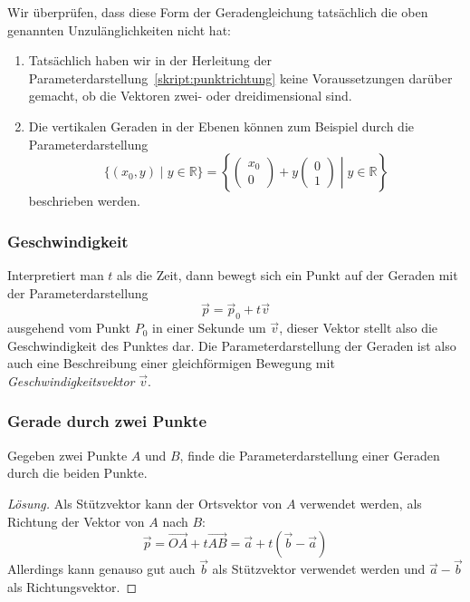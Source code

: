 Wir überprüfen, dass diese Form der Geradengleichung tatsächlich die
oben genannten Unzulänglichkeiten nicht hat:
\begin{enumerate}
\item Tatsächlich haben wir in der Herleitung der
Parameterdarstellung~\eqref{skript:punktrichtung} keine Voraussetzungen
darüber gemacht, ob die Vektoren zwei- oder dreidimensional sind.
\item Die vertikalen Geraden in der Ebenen können zum Beispiel durch die
Parameterdarstellung
\[
\{ (x_0,y)\;|\; y\in\mathbb R\}
=
\left\{
\left.
\begin{pmatrix}x_0\\0\end{pmatrix}
+
y\begin{pmatrix}0\\1\end{pmatrix}
\;
\right|
\;
y\in\mathbb R
\right\}
\]
beschrieben werden.
\end{enumerate}

\subsubsection{Geschwindigkeit}
Interpretiert man $t$ als die Zeit, dann bewegt sich ein Punkt auf der
Geraden mit der Parameterdarstellung
\[
\vec{p} = \vec{p}_0 + t \vec{v}
\]
ausgehend vom Punkt $P_0$ in einer Sekunde um $\vec v$,
dieser Vektor stellt also die Geschwindigkeit des Punktes dar.
Die Parameterdarstellung der Geraden ist also auch eine
Beschreibung einer gleichförmigen Bewegung mit {\em Geschwindigkeitsvektor}
$\vec{v}$.

\subsubsection{Gerade durch zwei Punkte}
\begin{aufgabe}
Gegeben zwei Punkte $A$ und $B$, finde die Parameterdarstellung einer
Geraden durch die beiden Punkte.
\end{aufgabe}
\begin{proof}[Lösung]
Als Stützvektor kann der Ortsvektor von $A$ verwendet werden, als Richtung
der Vektor von $A$ nach $B$:
\[
\vec{p}
=
\overrightarrow{OA} + t\overrightarrow{AB}
=
\vec{a} + t(\vec{b}-\vec{a})
\]
Allerdings kann genauso gut auch $\vec{b}$ als Stützvektor verwendet
werden und $\vec{a}-\vec{b}$ als Richtungsvektor.
\end{proof}

